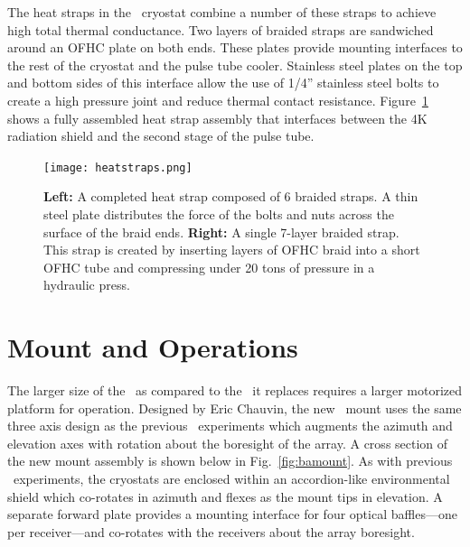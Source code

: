 \documentclass[]{spie}  %
\begin{document}
The heat straps in the \biceparray\ cryostat combine a number of these straps
to achieve high total thermal conductance. Two layers of braided straps are
sandwiched around an OFHC plate on both ends. These plates provide mounting
interfaces to the rest of the cryostat and the pulse tube cooler. Stainless
steel plates on the top and bottom sides of this interface allow the use of
1/4'' stainless steel bolts to create a high pressure joint and reduce thermal
contact resistance. Figure~\ref{fig:heatstrap} shows a fully assembled heat
strap assembly that interfaces between the 4K radiation shield and the second
stage of the pulse tube.



\begin{figure}[t]
\center
\texttt{[image: heatstraps.png]}
\caption{\textbf{Left:} A completed heat strap composed of 6 braided straps. A thin steel plate distributes the force of the bolts and nuts across the surface of the braid ends. \textbf{Right:} A single 7-layer braided strap. This strap is created by inserting layers of OFHC braid into a short OFHC tube and compressing under 20 tons of pressure in a hydraulic press.}
\label{fig:heatstrap}
\end{figure}


\section{Mount and Operations}

The larger size of the \biceparray\ as compared to the \keckarray\ it replaces
requires a larger motorized platform for operation. Designed by Eric Chauvin,
the new \biceparray\ mount uses the same three axis design as the previous
\bk\ experiments which augments the azimuth and elevation axes with
rotation about the boresight of the array. A
cross section of the new mount assembly is shown below in Fig.~\ref{fig:bamount}.
As with previous \bk\ experiments, the cryostats
are enclosed within an accordion-like environmental shield which co-rotates in
azimuth and flexes as the mount tips in elevation. A separate forward
plate provides a mounting interface for four optical baffles---one per
receiver---and co-rotates with the receivers about the array boresight.
\end{document}
